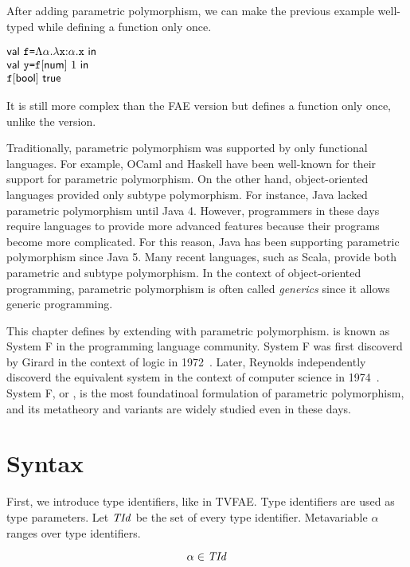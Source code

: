 After adding parametric polymorphism, we can make the previous example well-typed
while defining a function only once.

$
  \begin{array}{@{}l}
    \ebind{\cf}{\etfun{\alpha}{\efunt{\cx}{\alpha}{\cx}}}{\\
    \ebind{\cy}{\etapp{\cf}{\tnum}\ 1}{\\
    \etapp{\cf}{\tbool}\ \textsf{true}
    }}
  \end{array}
$

It is still more complex than the \textsf{FAE} version but defines a function
only once, unlike the \plang version.

Traditionally, parametric polymorphism was supported by only functional
languages. For example, OCaml and Haskell have been well-known for their support for
parametric polymorphism. On the other hand, object-oriented languages
provided only subtype polymorphism. For instance, Java lacked parametric
polymorphism until Java 4. However, programmers in these days require languages
to provide more advanced features because their programs become more
complicated. For this reason, Java has been supporting parametric polymorphism
since Java 5. Many recent languages, such as Scala, provide both parametric and
subtype polymorphism. In the context of object-oriented programming, parametric
polymorphism is often called \textit{generics} since it allows
generic programming.

This chapter defines \lang by extending \plang with parametric polymorphism.
\lang is known as System F in the programming language community. System F was
first discoverd by Girard in the context of logic in
1972~\cite{girard1972interpretation}. Later, Reynolds independently discoverd
the equivalent system in the context of computer science in
1974~\cite{reynolds1974towards}. System F, or \lang, is the most foundatinoal
formulation of parametric polymorphism, and its metatheory and variants are
widely studied even in these days.

\section{Syntax}

First, we introduce type identifiers, like in \textsf{TVFAE}. Type identifiers
are used as type parameters. Let $\mbox{\emph{TId}}$ be the set of every type identifier.
Metavariable $\alpha$ ranges over type identifiers.

\[ \alpha \in \mbox{\emph{TId}} \]

